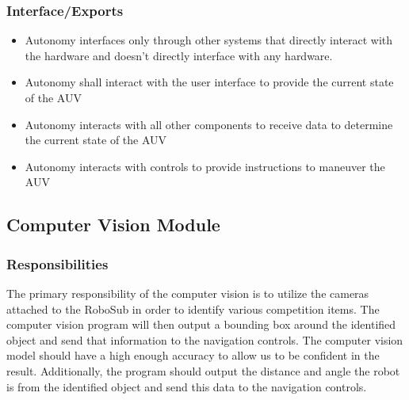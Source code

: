 \subsubsection{Interface/Exports}
\label{sec:exports}

\begin{itemize}
    \item Autonomy interfaces only through other systems that directly interact
        with the hardware and doesn’t directly interface with any hardware.  
    \item Autonomy shall interact with the user interface to provide the
        current state of the AUV  
    \item Autonomy interacts with all other components to receive data to
        determine the current state of the AUV 
    \item Autonomy interacts with controls to provide instructions to maneuver
        the AUV
\end{itemize}

\subsection{Computer Vision Module}
\label{sec:vision_design}

\subsubsection{Responsibilities}
\label{sec:responsibilities}

The primary responsibility of the computer vision is to utilize the cameras
attached to the RoboSub in order to identify various competition items. The
computer vision program will then output a bounding box around the identified
object and send that information to the navigation controls. The computer
vision model should have a high enough accuracy to allow us to be confident in
the result. Additionally, the program should output the distance and angle the
robot is from the identified object and send this data to the navigation
controls.
\par

